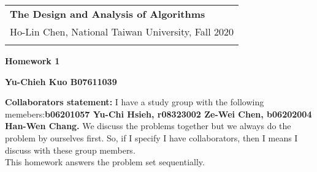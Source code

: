 \documentclass[a4paper,12pt]{article}
\begin{document}
\thispagestyle{plain} %

\begin{tabular}{p{15.5cm}} %
{\large \bf The Design and Analysis of Algorithms} \\
Ho-Lin Chen, National Taiwan University, Fall 2020  \\
\hline %
\\
\end{tabular} %

\vspace*{0.3cm} %

\begin{center} %
	{\Large \bf Homework 1} %
	\vspace{2mm}
	
	{\bf Yu-Chieh Kuo B07611039} %
		
\end{center}  
\vspace{0.4cm}

\textbf{Collaborators statement:} I have a study group with the following memebers:\textbf{b06201057 Yu-Chi Hsieh, r08323002 Ze-Wei Chen, b06202004 Han-Wen Chang.} We discuss the problems together but we always do the problem by ourselves first. So, if I specify I have collaborators, then I means I discuss with these group members. \\
This homework answers the problem set sequentially. 
\end{document}
